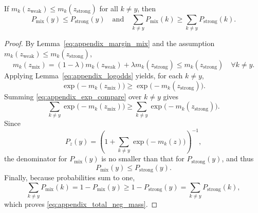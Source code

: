 \begin{theorem}
If $m_k(z_{\mathrm{weak}}) \le m_k(z_{\mathrm{strong}})$ for all $k \neq y$, then
\begin{equation}
    P_{\mathrm{mix}}(y) \le P_{\mathrm{strong}}(y)
    \quad \text{and} \quad
    \sum_{k \neq y} P_{\mathrm{mix}}(k) \ge \sum_{k \neq y} P_{\mathrm{strong}}(k).
    \label{eq:appendix_total_neg_mass}
\end{equation}
\end{theorem}
\begin{proof}
By Lemma~\eqref{eq:appendix_margin_mix} and the assumption $m_k(z_{\mathrm{weak}}) \le m_k(z_{\mathrm{strong}})$,
\begin{equation}
    m_k(z_{\text{mix}}) = (1-\lambda)m_k(z_{\mathrm{weak}}) + \lambda m_k(z_{\mathrm{strong}}) \le m_k(z_{\mathrm{strong}})
    \quad \forall k \neq y.
    \label{eq:appendix_margin_shrink}
\end{equation}
Applying Lemma~\eqref{eq:appendix_logodds} yields, for each $k \neq y$,
\begin{equation}
    \exp\!\big(-m_k(z_{\text{mix}})\big) \ge \exp\!\big(-m_k(z_{\mathrm{strong}})\big).
    \label{eq:appendix_exp_compare}
\end{equation}
Summing \eqref{eq:appendix_exp_compare} over $k \neq y$ gives
\begin{equation}
    \sum_{k \neq y} \exp\!\big(-m_k(z_{\text{mix}})\big)
    \ge
    \sum_{k \neq y} \exp\!\big(-m_k(z_{\mathrm{strong}})\big).
    \label{eq:appendix_sum_compare}
\end{equation}
Since
\begin{equation}
    P_z(y) = \left(1 + \sum_{k \neq y} \exp\!\big(-m_k(z)\big)\right)^{-1},
    \label{eq:appendix_py_denominator}
\end{equation}
the denominator for $P_{\mathrm{mix}}(y)$ is no smaller than that for $P_{\mathrm{strong}}(y)$, and thus
\begin{equation}
    P_{\mathrm{mix}}(y) \le P_{\mathrm{strong}}(y).
    \label{eq:appendix_py_compare}
\end{equation}
Finally, because probabilities sum to one,
\begin{equation}
    \sum_{k \neq y} P_{\mathrm{mix}}(k)
    = 1 - P_{\mathrm{mix}}(y)
    \ge 1 - P_{\mathrm{strong}}(y)
    = \sum_{k \neq y} P_{\mathrm{strong}}(k),
    \label{eq:appendix_neg_mass_compare}
\end{equation}
which proves \eqref{eq:appendix_total_neg_mass}.
\end{proof}


